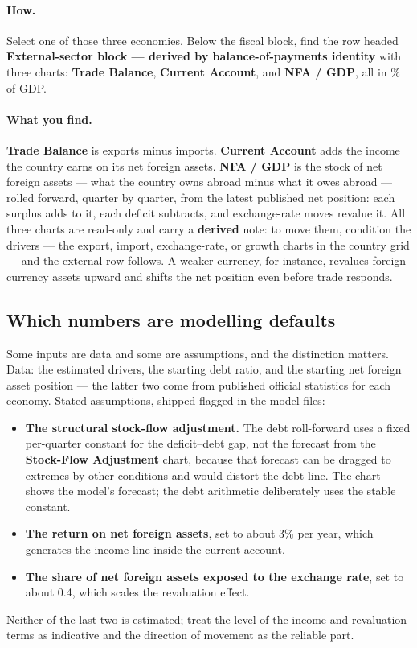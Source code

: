 \documentclass[11pt]{article}
\theoremstyle{definition}
\theoremstyle{remark}
\begin{document}
\paragraph{How.} Select one of those three economies. Below the fiscal block, find the row
headed \textbf{External-sector block --- derived by balance-of-payments identity} with three
charts: \textbf{Trade Balance}, \textbf{Current Account}, and \textbf{NFA / GDP}, all in \% of
GDP.

\paragraph{What you find.} \textbf{Trade Balance} is exports minus imports. \textbf{Current
Account} adds the income the country earns on its net foreign assets. \textbf{NFA / GDP} is
the stock of net foreign assets --- what the country owns abroad minus what it owes abroad ---
rolled forward, quarter by quarter, from the latest published net position: each surplus adds
to it, each deficit subtracts, and exchange-rate moves revalue it. All three charts are
read-only and carry a \textbf{derived} note: to move them, condition the drivers --- the
export, import, exchange-rate, or growth charts in the country grid --- and the external row
follows. A weaker currency, for instance, revalues foreign-currency assets upward and shifts
the net position even before trade responds.

\subsection{Which numbers are modelling defaults}

Some inputs are data and some are assumptions, and the distinction matters. Data: the estimated
drivers, the starting debt ratio, and the starting net foreign asset position --- the latter
two come from published official statistics for each economy. Stated assumptions, shipped
flagged in the model files:
\begin{itemize}
  \item \textbf{The structural stock-flow adjustment.} The debt roll-forward uses a fixed
    per-quarter constant for the deficit--debt gap, not the forecast from the
    \textbf{Stock-Flow Adjustment} chart, because that forecast can be dragged to extremes by
    other conditions and would distort the debt line. The chart shows the model's forecast; the
    debt arithmetic deliberately uses the stable constant.
  \item \textbf{The return on net foreign assets}, set to about 3\% per year, which generates
    the income line inside the current account.
  \item \textbf{The share of net foreign assets exposed to the exchange rate}, set to about
    0.4, which scales the revaluation effect.
\end{itemize}
Neither of the last two is estimated; treat the level of the income and revaluation terms as
indicative and the direction of movement as the reliable part.
\end{document}
